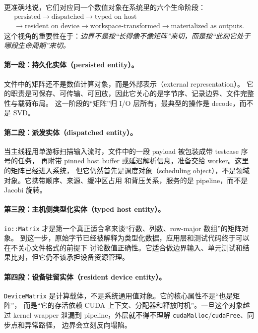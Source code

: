 更准确地说，它们对应同一个数值对象在系统里的六个生命阶段：
\[
    \begin{gathered}
        \text{persisted}
        \rightarrow
        \text{dispatched}
        \rightarrow
        \text{typed on host} \\
        \rightarrow
        \text{resident on device}
        \rightarrow
        \text{workspace-transformed}
        \rightarrow
        \text{materialized as outputs}.
    \end{gathered}
\]
这个视角的重要性在于：\emph{边界不是按“长得像不像矩阵”来切，而是按“此刻它处于哪段生命周期”来切。}

\paragraph{第一段：持久化实体（persisted entity）。}
文件中的矩阵还不是数值计算对象，而是外部表示（external representation）。
它的职责是可保存、可传输、可回放，因此它关心的是字节序、记录边界、文件完整性与载荷布局。
这一阶段的“矩阵”归 I/O 层所有，最典型的操作是 decode，而不是 SVD。

\paragraph{第二段：派发实体（dispatched entity）。}
当主线程用单游标扫描输入流时，文件中的一段 payload 被包装成带 testcase 序号的任务，
再附带 pinned host buffer 或延迟解析信息，准备交给 worker。这里的矩阵已经进入系统，
但它仍然首先是调度对象（scheduling object），不是领域对象。它携带顺序、来源、缓冲区占用
和背压关系，服务的是 pipeline，而不是 Jacobi 旋转。

\paragraph{第三段：主机侧类型化实体（typed host entity）。}
\texttt{io::Matrix} 才是第一个真正适合拿来谈“行数、列数、row-major 数组”的矩阵对象。
到这一步，原始字节已经被解释为类型化数据，应用层和测试代码终于可以在不关心文件格式的前提下
讨论数值正确性。它适合做边界输入、单元测试和结果比对，但它仍不该承担设备资源管理。

\paragraph{第四段：设备驻留实体（resident device entity）。}
\texttt{DeviceMatrix} 是计算载体，不是系统通用值对象。它的核心属性不是“也是矩阵”，
而是“它的存活依赖 CUDA 上下文、分配器和释放时机”。一旦这个对象越过 kernel wrapper
泄漏到 pipeline，外层就不得不理解 \texttt{cudaMalloc}/\texttt{cudaFree}、同步点和异常路径，
边界会立刻反向塌陷。

